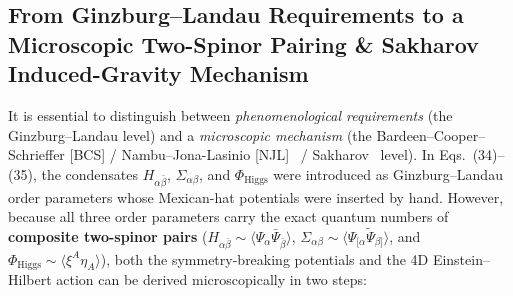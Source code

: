 \documentclass[11pt,a4paper]{article}
\begin{document}
\subsection{From Ginzburg--Landau Requirements to a Microscopic Two-Spinor Pairing \& Sakharov Induced-Gravity Mechanism}
It is essential to distinguish between \emph{phenomenological requirements} (the Ginzburg--Landau level) and a \emph{microscopic mechanism} (the Bardeen--Cooper--Schrieffer [BCS] / Nambu--Jona-Lasinio [NJL]~\cite{NJL1961} / Sakharov~\cite{Sakharov1967} level). In Eqs.\ (34)--(35), the condensates $H_{\alpha\bar{\beta}}$, $\Sigma_{\alpha\beta}$, and $\Phi_{\text{Higgs}}$ were introduced as Ginzburg--Landau order parameters whose Mexican-hat potentials were inserted by hand. However, because all three order parameters carry the exact quantum numbers of \textbf{composite two-spinor pairs} ($H_{\alpha\bar{\beta}} \sim \langle \Psi_\alpha \bar{\Psi}_{\bar{\beta}}\rangle$, $\Sigma_{\alpha\beta} \sim \langle \Psi_{[\alpha}\tilde{\Psi}_{\beta]}\rangle$, and $\Phi_{\text{Higgs}} \sim \langle \xi^A \eta_A\rangle$), both the symmetry-breaking potentials and the 4D Einstein--Hilbert action can be derived microscopically in two steps:
\end{document}
